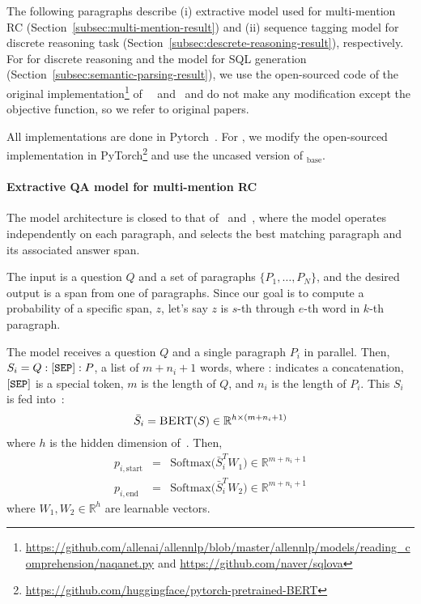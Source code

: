 \documentclass[11pt,a4paper]{article}
\begin{document}
The following paragraphs describe (i) \bert{} extractive model used for multi-mention RC (Section~\ref{subsec:multi-mention-result}) and (ii) \bert{} sequence tagging model for discrete reasoning task (Section~\ref{subsec:descrete-reasoning-result}), respectively. For \qanet{} for discrete reasoning and the model for SQL generation (Section~\ref{subsec:semantic-parsing-result}), we use the open-sourced code of the original implementation\footnote{\url{https://github.com/allenai/allennlp/blob/master/allennlp/models/reading_comprehension/naqanet.py} and \url{https://github.com/naver/sqlova}} of~~\citet{drop} and~\citet{hwang2019comprehensive} and do not make any modification except the objective function, so we refer to original papers.

All implementations are done in Pytorch~\citep{pytorch}. For \bert{}, we modify the open-sourced implementation in PyTorch\footnote{\url{https://github.com/huggingface/pytorch-pretrained-BERT}} and use the uncased version of \bert{}$_\text{base}$.

\paragraph{Extractive QA model for multi-mention RC}
The model architecture is closed to that of~\citet{min2019compositional} and~\citet{alberti2019bert}, where the model operates independently on each paragraph, and selects the best matching paragraph and its associated answer span.

The input is a question $Q$ and a set of paragraphs $\{P_1, \dots, P_N\}$, and the desired output is a span from one of paragraphs. Since our goal is to compute a probability of a specific span, $z$, let's say $z$ is $s$-th through $e$-th word in $k$-th paragraph.

The model receives a question $Q$ and a single paragraph $P_i$ in parallel. Then, $S_i = Q:{\tt [SEP]}:P$, a list of $m+n_i+1$ words, where : indicates a concatenation, ${\tt [SEP]}$ is a special token, $m$ is the length of $Q$, and $n_i$ is the length of $P_i$. This $S_i$ is fed into~\bert:
\begin{equation*}
    \bar{S}_i = \textsc{BERT} (S) \in \mathbb{R}^{h \times (m+n_i+1)}
\end{equation*}
where $h$ is the hidden dimension of~\bert. Then, 
\begin{eqnarray*}
    p_{i,\textrm{start}} &=& \mathrm{Softmax}  \big( \bar{S}_i^T W_1  \big)  \in \mathbb{R}^{m+n_i+1} \\
    p_{i,\textrm{end}} &=& \mathrm{Softmax} \big( \bar{S}_i^T W_2 \big) \in \mathbb{R}^{m+n_i+1} \end{eqnarray*}
where $W_1, W_2 \in \mathbb{R}^{h}$ are learnable vectors.
\end{document}
